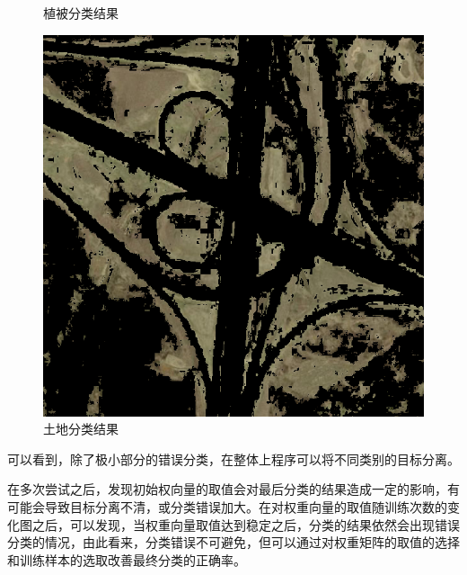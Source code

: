 \begin{figure}[H]
\begin{minipage}{0.3\linewidth}
		\caption{植被分类结果}
		\label{fig:viaduct_52_grass_separated}
	\end{minipage}
	\begin{minipage}{0.3\linewidth}
		\includegraphics[width=\linewidth]{figure/viaduct_52_Ground_Separated_P.png}
		\caption{土地分类结果}
		\label{fig:viaduct_52_ground_separated}
	\end{minipage}
\end{figure}
可以看到，除了极小部分的错误分类，在整体上程序可以将不同类别的目标分离。

在多次尝试之后，发现初始权向量的取值会对最后分类的结果造成一定的影响，有可能会导致目标分离不清，或分类错误加大。在对权重向量的取值随训练次数的变化图之后，可以发现，当权重向量取值达到稳定之后，分类的结果依然会出现错误分类的情况，由此看来，分类错误不可避免，但可以通过对权重矩阵的取值的选择和训练样本的选取改善最终分类的正确率。